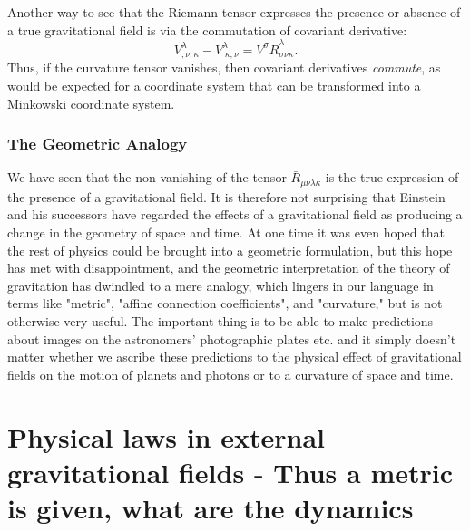 Another way to see that the Riemann tensor expresses the presence or absence of a true gravitational field is via the commutation of covariant derivative:
\begin{equation}
	V^\lambda_{;\nu;\kappa} - V^\lambda_{\;\kappa;\nu} = V^\sigma \bar{R}^\lambda_{\sigma \nu \kappa}.
\end{equation}
Thus, if the curvature tensor vanishes, then covariant derivatives \emph{commute}, as would be expected for a coordinate system that can be transformed into a Minkowski coordinate system.

\subsubsection{The Geometric Analogy}
We have seen that the non-vanishing of the tensor $\bar{R}_{\mu \nu \lambda \kappa}$ is the true expression of the presence of a gravitational field. It is therefore not surprising that Einstein and his successors have regarded the effects of a gravitational field as producing a change in the geometry of space and time. At one time it was even hoped that the rest of physics could be brought into a geometric formulation, but this hope has met with disappointment, and the geometric interpretation of the theory of gravitation has dwindled to a mere analogy, which lingers in our language in terms like "metric", "affine connection coefficients", and "curvature," but is not otherwise very useful. The important thing is to be able to make predictions about images on the astronomers' photographic plates etc. and it simply doesn't matter whether we ascribe these predictions to the physical effect of gravitational fields on the motion of planets and photons or to a curvature of space and time.\\


































\newpage

\section{Physical laws in external gravitational fields - Thus a metric is given, what are the dynamics}

